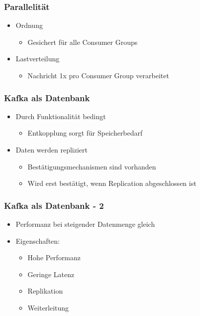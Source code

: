 \begin{frame}
\frametitle{Parallelität}

\begin{itemize}
	\item Ordnung 
	\begin{itemize}
		\item Gesichert für alle Consumer Groups
	\end{itemize}
	\item Lastverteilung
		\begin{itemize}
		\item Nachricht 1x pro Consumer Group verarbeitet
	\end{itemize}
\end{itemize}

\end{frame}

\begin{frame}
\frametitle{Kafka als Datenbank}

\begin{itemize}
	\item Durch Funktionalität bedingt
	\begin{itemize}
		\item Entkopplung sorgt für Speicherbedarf
	\end{itemize}
	\item Daten werden repliziert
	\begin{itemize}
		\item Bestätigungsmechanismen sind vorhanden
		\item Wird erst bestätigt, wenn Replication abgeschlossen ist
	\end{itemize}
\end{itemize}

\end{frame}

\begin{frame}
\frametitle{Kafka als Datenbank - 2}

\begin{itemize}
	\item Performanz bei steigender Datenmenge gleich
	\item Eigenschaften:
	\begin{itemize}
		\item Hohe Performanz
		\item Geringe Latenz %
		\item Replikation
		\item Weiterleitung %
	\end{itemize}
\end{itemize}

\end{frame}

